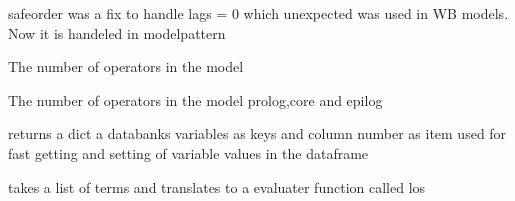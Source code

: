 \documentclass[letterpaper,10pt,english]{sphinxmanual}
\begin{document}
\begin{fulllineitems}
\begin{fulllineitems}
\sphinxAtStartPar
safeorder was a fix to handle lags = \sphinxhyphen{}0 which unexpected was used in WB models. Now it is handeled in modelpattern

\end{fulllineitems}


\begin{fulllineitems}
\label{\detokenize{index:modelclass.BaseModel.calculate_freq}}
\pysigstartsignatures
{}
\pysigstopsignatures
\sphinxAtStartPar
The number of operators in the model

\end{fulllineitems}


\begin{fulllineitems}
\label{\detokenize{index:modelclass.BaseModel.flop_get}}
\pysigstartsignatures
{}
\pysigstopsignatures
\sphinxAtStartPar
The number of operators in the model prolog,core and epilog

\end{fulllineitems}


\begin{fulllineitems}
\label{\detokenize{index:modelclass.BaseModel.get_columnsnr}}
\pysigstartsignatures
{}
\pysigstopsignatures
\sphinxAtStartPar
returns a dict a databanks variables as keys and column number as item
used for fast getting and setting of variable values in the dataframe

\end{fulllineitems}


\begin{fulllineitems}
\label{\detokenize{index:modelclass.BaseModel.outeval}}
\pysigstartsignatures
{}
\pysigstopsignatures
\sphinxAtStartPar
takes a list of terms and translates to a evaluater function called los


\end{fulllineitems}
\end{fulllineitems}
\end{document}
